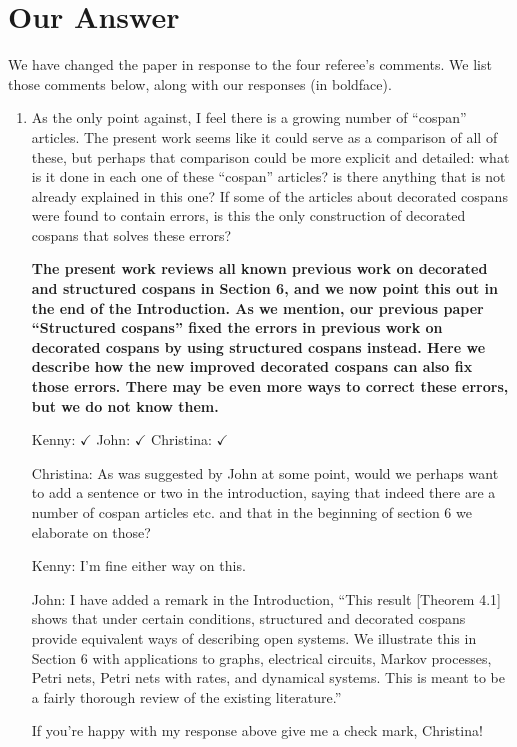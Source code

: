 \documentclass[reqno]{amsart}
\def\chris{\color{purple} Christina: }
\def\john{\color{red} John: }
\def\kenny{\color{blue} Kenny: }
\begin{document}
\section{Our Answer}
\fi

We have changed the paper in response to the four referee's comments.  We list those comments below, along with our
responses (in boldface).

\begin{enumerate}

\item As the only point against, I feel there is a growing number of “cospan” articles. The present work seems like it could serve as a 
comparison of 
all of 
these, but perhaps that comparison could be more explicit and detailed: what is it done in each one of these “cospan” articles? is there anything 
that 
is not already explained in this one? If some of the articles about decorated cospans were found to contain errors, is this the only construction of 
decorated cospans that solves these errors?

{\bf The present work reviews all known previous work on decorated and structured cospans in Section 6, and we now point this out in the end of 
the Introduction.   As we mention, our previous paper ``Structured 
cospans'' fixed the errors in previous work on decorated cospans by using structured cospans instead.   Here we describe how the new improved 
decorated cospans can also fix those errors.     There may be even more ways to correct these errors, but we do not know them.}  

{\kenny $\checkmark$}  {\john $\checkmark$} {\chris $\checkmark$}

\iffalse
{\chris As was suggested by John at some point, would we perhaps want to add a sentence or two in the introduction, saying that indeed there are a 
number of cospan articles etc. and that in the beginning of section 6 we elaborate on those?}

{\kenny I'm fine either way on this.}

{\john I have added a remark in the Introduction, ``This result [Theorem 4.1] shows that under certain conditions, structured and decorated cospans 
provide equivalent ways of describing open systems.  We illustrate this in Section 6 with applications to graphs, electrical circuits, Markov 
processes, Petri nets, Petri nets with rates, and dynamical systems.   This is meant to be a fairly thorough review of the existing literature.'' 

If you're happy with my response above give me a check mark, Christina!}


\end{enumerate}
\end{document}
